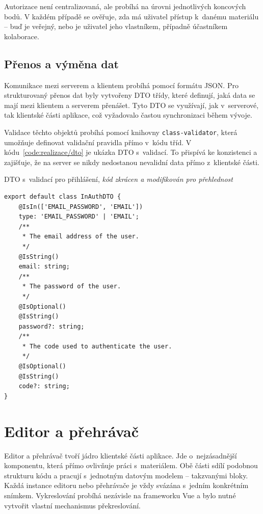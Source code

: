Autorizace není centralizovaná, ale probíhá na úrovni jednotlivých koncových bodů. 
V každém případě se ověřuje, zda má uživatel přístup k~danému materiálu -- buď je veřejný, nebo je uživatel jeho vlastníkem, případně účastníkem kolaborace.

\subsection{Přenos a výměna dat}

Komunikace mezi serverem a klientem probíhá pomocí formátu JSON.
Pro strukturovaný přenos dat byly vytvořeny DTO třídy, které definují, jaká data se mají mezi klientem a serverem přenášet. 
Tyto DTO se využívají, jak v~serverové, tak klientské části aplikace, což vyžadovalo častou synchronizaci během vývoje.

Validace těchto objektů probíhá pomocí knihovny \texttt{class-validator}, která umožňuje definovat validační pravidla přímo v~kódu tříd.
V kódu~\ref{code:realizace/dto} je ukázka DTO s~validací.
To přispívá ke konzistenci a zajišťuje, že na server se nikdy nedostanou nevalidní data přímo z~klientské části.


\begin{listing}[ht!]
\caption[DTO s~validací pro přihlášení]{DTO s~validací pro přihlášení, \textit{kód zkrácen a modifikován pro přehlednost}}\label{code:realizace/dto}
\begin{verbatim}
export default class InAuthDTO {
    @IsIn(['EMAIL_PASSWORD', 'EMAIL'])
    type: 'EMAIL_PASSWORD' | 'EMAIL';
    /**
     * The email address of the user.
     */
    @IsString()
    email: string;
    /**
     * The password of the user.
     */
    @IsOptional()
    @IsString()
    password?: string;
    /**
     * The code used to authenticate the user.
     */
    @IsOptional()
    @IsString()
    code?: string;
}
\end{verbatim}
\end{listing}

\section{Editor a přehrávač}\label{text:realizace/editor}

Editor a přehrávač tvoří jádro klientské části aplikace. 
Jde o~nejzásadnější komponentu, která přímo ovlivňuje práci s~materiálem. 
Obě části sdílí podobnou strukturu kódu a pracují s~jednotným datovým modelem -- takzvanými bloky. 
Každá instance editoru nebo přehrávače je vždy svázána s~jedním konkrétním snímkem. 
Vykreslování probíhá nezávisle na frameworku Vue a bylo nutné vytvořit vlastní mechanismus překreslování.

